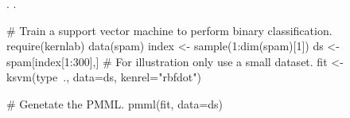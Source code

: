 \begin{SeeAlso}\relax
{}.
.
\end{SeeAlso}
\begin{Examples}
\begin{ExampleCode}
# Train a support vector machine to perform binary classification.
require(kernlab)
data(spam)
index <- sample(1:dim(spam)[1])
ds <- spam[index[1:300],] # For illustration only use a small dataset.
fit <- ksvm(type~., data=ds, kenrel="rbfdot")

# Genetate the PMML.
pmml(fit, data=ds)
\end{ExampleCode}
\end{Examples}

